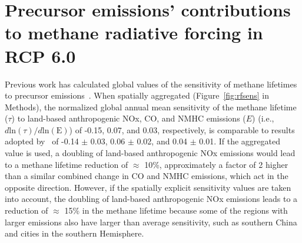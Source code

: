 \section{Precursor emissions' contributions to methane radiative forcing in RCP 6.0}

Previous work has calculated global values of the sensitivity of methane lifetimes to precursor emissions~\citep{ref:fry2012,ref:holmes2013}. When spatially aggregated (Figure~\ref{fig:rfsens} in Methods), the normalized global annual mean sensitivity of the methane lifetime ($\tau$) to land-based anthropogenic NOx, CO, and NMHC emissions ($E$) (i.e., $d \mathrm{ln}(\tau)/d\mathrm{ln}(\mathrm{E})$) of -0.15, 0.07, and 0.03, respectively, is comparable to results adopted by~\citet{ref:holmes2013} of -0.14 $\pm$ 0.03, 0.06 $\pm$ 0.02, and 0.04 $\pm$ 0.01. If the aggregated value is used, a doubling of land-based anthropogenic NOx emissions would lead to a methane lifetime reduction of $\approx$ 10\%, approximately a factor of 2 higher than a similar combined change in CO and NMHC emissions, which act in the opposite direction. However, if the spatially explicit sensitivity values are taken into account, the doubling of land-based anthropogenic NOx emissions leads to a reduction of $\approx$ 15\% in the methane lifetime because some of the regions with larger emissions also have larger than average sensitivity, such as southern China and cities in the southern Hemisphere.


